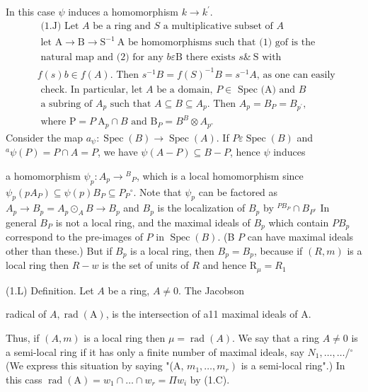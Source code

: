 In this case $\psi$ induces a homomorphism $k \rightarrow k^{\prime}$.
$$
\begin{aligned}
& \text { (1.J) Let } A \text { be a ring and } S \text { a multiplicative subset of } A \\
& \text { let } \mathrm{A} \rightarrow \mathrm{B} \rightarrow \mathrm{S}^{-1} \mathrm{~A} \text { be homomorphisms such that (1) gof is the } \\
& \text { natural map and (2) for any } b \varepsilon \mathrm{B} \text { there exists } s \& \mathrm{~S} \text { with } \\
& f(s) b \in f(A) \text {. Then } s^{-1} B=f(S)^{-1} B=s^{-1} A \text {, as one can easily } \\
& \text { check. In particular, let } A \text { be a domain, } P \in \text { Spec (A) and } B \\
& \text { a subring of } A_{p} \text { such that } A \subseteq B \subseteq A_{p} \text {. Then } A_{p}=B_{P}=B_{p^{\prime}} \text {, } \\
& \text { where } \mathrm{P}=P \mathrm{~A}_{p} \cap B \text { and } \mathrm{B}_{P}=B^{B} \otimes A_{p^{\circ}} 
\end{aligned}
$$
Consider the map $a_{\psi}: \operatorname{Spec}(B) \rightarrow \operatorname{Spec}(A)$. If $P \varepsilon \operatorname{Spec}(B)$ and ${ }^{a} \psi(P)=P \cap A=P$, we have $\psi(A-P) \subseteq B-P$, hence $\psi$ induces

a homomorphism $\psi_{p}: A_{p} \rightarrow{ }^{B}{ }_{P}$, which is a local homomorphism since $\psi_{p}\left(p A_{P}\right) \subseteq \psi(p) B_{P} \subseteq P_{P}{ }^{\circ}$. Note that $\psi_{p}$ can be factored as $A_{p} \rightarrow B_{p}=A_{p} \odot_{A} B \rightarrow B_{p}$ and $B_{p}$ is the localization of $B_{p}$ by ${ }^{P B_{P}} \cap B_{P^{\circ}}$ In general $B_{P}$ is not a local ring, and the maximal ideals of $B_{p}$ which contain $P B_{p}$ correspond to the pre-images of $P$ in $\operatorname{Spec}(B)$. (B $P$ can have maximal ideals other than these.) But if $B_{p}$ is a local ring, then $B_{p}=B_{p}$, because if $(R, m)$ is a local ring then $R-w$ is the set of units of $R$ and hence $\mathrm{R}_{\mu}=R_{1}$

(1.L) Definition. Let $A$ be a ring, $A \neq 0$. The Jacobson

radical of $A, \operatorname{rad}(\mathrm{A})$, is the intersection of a11 maximal ideals of A.

Thus, if $(A, m)$ is a local ring then $\mu=\operatorname{rad}(A)$. We say that a ring $A \neq 0$ is a semi-local ring if it has only a finite number of maximal ideals, say $N_{1}, \ldots, \ldots /{ }^{\circ}$ (We express this situation by saying "(A, $\left.m_{1}, \ldots, m_{r}\right)$ is a semi-local ring".) In this cass $\operatorname{rad}(\mathrm{A})=w_{1} \cap \ldots \cap w_{r}=\Pi w_{i}$ by (1.C).

